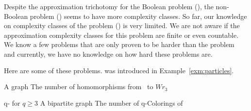 Despite the approximation trichotomy for the Boolean problem \ccsp(\mrelset),
the non-Boolean problem \ccsp(\mrelset) seems to have more complexity classes.
So far, our knowledge on complexity classes of the problem \ccsp(\mrelset) 
is very limited. We are not aware if the approximation
complexity classes for this problem are finite or even countable.
We know a few problems that are only proven to be harder than
the problem \cbis\ \cite{Leslie03} and currently, 
we have no knowledge on how hard these problems are.

Here are some of these problems.  was introduced in
Example~\ref{exm:particles}.

{A graph \mG}
{The number of homomorphisms from \mG\ to \(Wr_3\)}

\pdef
{ q- for \(q\ge 3\)}
{A bipartite graph \mG}
{The number of q-Colorings of \mG}
